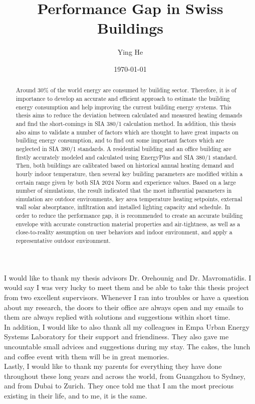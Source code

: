 \documentclass[a4paper, oneside]{discothesis}
\title{Performance Gap in Swiss Buildings}
\author{Ying He}
\institute{Chair of Building Physics\\[2pt]
ETH Zürich\\[2pt]
Laboratory for Urban Energy Systems\\[2pt]
Empa,Dübendorf\\[2pt]}
\date{\today}
\begin{document}
\frontmatter %
\maketitle

\cleardoublepage

\begin{acknowledgements}
 
 I would like to thank my thesis advisors Dr. Orehounig and Dr. Mavromatidis. I would say I was very lucky to meet them and be able to take this thesis project from two excellent supervisors. Whenever I ran into troubles or have a question about my research, the doors to their office are always open and my emails to them are always replied with solutions and suggestions within short time.\\

 In addition, I would like to also thank all my colleagues in Empa Urban Energy Systems Laboratory for their support and friendiness. They also gave me uncountable small advices and suggestions during my stay. The cakes, the lunch and coffee event with them will be in great memories.\\

 Lastly, I would like to thank my parents for everything they have done throughout these long years and across the world, from Guangzhou to Sydney, and from Dubai to Zurich. They once told me that I am the most precious existing in their life, and to me, it is the same.
\end{acknowledgements}


\begin{abstract}
 	Around 30\% of the world energy are consumed by building sector. Therefore, it is of importance to develop an accurate and efficient approach to estimate the building energy consumption and help improving the current building energy systems. This thesis aims to reduce the deviation between calculated and measured heating demands and find the short-comings in SIA 380/1 calculation method. In addition, this thesis also aims to validate a number of factors which are thought to have great impacts on building energy consumption, and to find out some important factors which are neglected in SIA 380/1 standards. A residential building and an office building are firstly accurately modeled and calculated using EnergyPlus and SIA 380/1 standard. Then, both buildings are  calibrated based on historical annual heating demand and hourly indoor temperature, then several key building parameters are modified within a certain range given by both SIA 2024 Norm and experience values. Based on a large number of simulations, the result indicated that the most influential parameters in simulation are outdoor environments, key area temperature heating setpoints, external wall solar absorptance, infiltration and installed lighting capacity and schedule. In order to reduce the performance gap, it is recommended to create an accurate building envelope with accurate construction material properties and air-tightness, as well as a close-to-reality assumption on user behaviors and indoor environment, and apply a representative outdoor environment.
\end{abstract}
\end{document}
